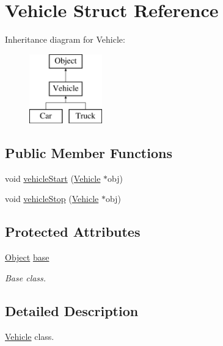 \hypertarget{struct_vehicle}{\section{Vehicle Struct Reference}
\label{struct_vehicle}
}
Inheritance diagram for Vehicle\-:\begin{figure}[H]
\begin{center}
\leavevmode
\includegraphics[height=3.000000cm]{struct_vehicle}
\end{center}
\end{figure}
\subsection*{Public Member Functions}
\begin{DoxyCompactItemize}
\item 
void \hyperlink{struct_vehicle_a6891d3d28853bc3fdd075596dc6de9f8}{vehicle\-Start} (\hyperlink{struct_vehicle}{Vehicle} $\ast$obj)
\item 
void \hyperlink{struct_vehicle_a4dcbcba43792dcd673a552b14479ab77}{vehicle\-Stop} (\hyperlink{struct_vehicle}{Vehicle} $\ast$obj)
\end{DoxyCompactItemize}
\subsection*{Protected Attributes}
\begin{DoxyCompactItemize}
\item 
\hypertarget{struct_vehicle_ad7970f528d429f6fc1725173e93a77c2}{\hyperlink{struct_object}{Object} \hyperlink{struct_vehicle_ad7970f528d429f6fc1725173e93a77c2}{base}}\label{struct_vehicle_ad7970f528d429f6fc1725173e93a77c2}

\begin{DoxyCompactList}\small\item\em Base class. \end{DoxyCompactList}\end{DoxyCompactItemize}


\subsection{Detailed Description}
\hyperlink{struct_vehicle}{Vehicle} class. 


